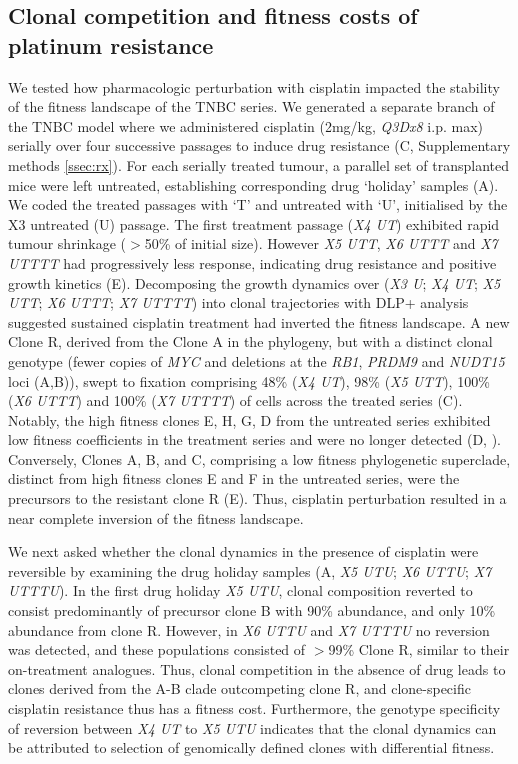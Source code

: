 \subsection*{Clonal competition and fitness costs of platinum resistance}
We tested how pharmacologic perturbation with cisplatin impacted the stability of the fitness landscape of the TNBC series. We generated a separate branch of the TNBC model where we administered cisplatin (2mg/kg, \textit{Q3Dx8} i.p. max) serially over four successive passages to induce drug resistance (C, Supplementary methods \ref{ssec:rx}). For each serially treated tumour, a parallel set of transplanted mice were left untreated, establishing corresponding drug ‘holiday’ samples (A). We coded the treated passages with ‘T’ and untreated with ‘U’, initialised by the X3 untreated (U) passage. The first treatment passage (\textit{X4 UT}) exhibited rapid tumour shrinkage ($>$50\% of initial size). However \textit{X5 UTT}, \textit{X6 UTTT} and \textit{X7 UTTTT} had progressively less response, indicating drug resistance and positive growth kinetics (E). Decomposing the growth dynamics over (\textit{X3 U}; \textit{X4 UT}; \textit{X5 UTT}; \textit{X6 UTTT}; \textit{X7 UTTTT}) into clonal trajectories with DLP+ analysis suggested sustained cisplatin treatment had inverted the fitness landscape. A new Clone R,  derived from the Clone A in the phylogeny, but with a distinct clonal genotype (fewer copies of \textit{MYC} and deletions at the \textit{RB1}, \textit{PRDM9} and \textit{NUDT15} loci (A,B)), swept to fixation comprising 48\% (\textit{X4 UT}), 98\% (\textit{X5 UTT}), 100\% (\textit{X6 UTTT}) and 100\% (\textit{X7 UTTTT}) of cells across the treated series (C). Notably, the high fitness clones E, H, G, D from the untreated series exhibited low fitness coefficients in the treatment series and were no longer detected (D, ). Conversely, Clones A, B, and C, comprising a low fitness phylogenetic superclade, distinct from high fitness clones E and F in the untreated series, were the precursors to the resistant clone R  (E). Thus, cisplatin perturbation resulted in a near complete inversion of the fitness landscape.

We next asked whether the clonal dynamics in the presence of cisplatin were reversible by examining the drug holiday samples (A, \textit{X5 UTU}; \textit{X6 UTTU}; \textit{X7 UTTTU}). In the first drug holiday \textit{X5 UTU}, clonal composition reverted to consist predominantly of precursor clone B with 90\% abundance, and only 10\% abundance from clone R.  However, in \textit{X6 UTTU} and \textit{X7 UTTTU} no reversion was detected, and these populations consisted of  $>$99\% Clone R, similar to their on-treatment analogues. Thus, clonal competition in the absence of drug leads to clones derived from the A-B clade outcompeting clone R, and clone-specific cisplatin resistance thus has a fitness cost. Furthermore, the genotype specificity of reversion between \textit{X4 UT} to \textit{X5 UTU} indicates that the clonal dynamics can be attributed to selection of genomically defined clones with differential fitness. 

